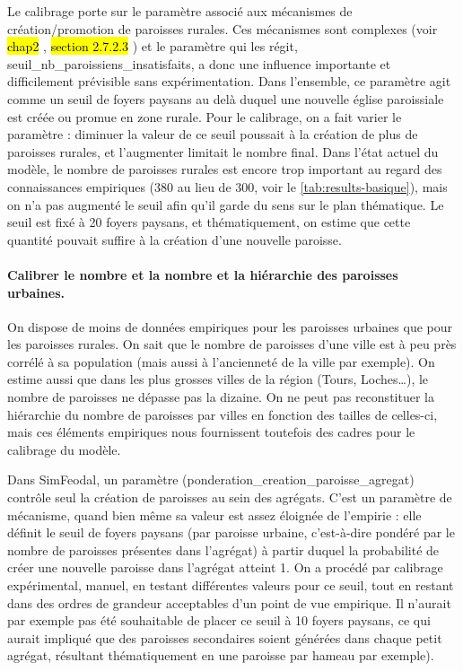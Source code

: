 Le calibrage porte sur le paramètre associé aux mécanismes de création/promotion de paroisses rurales.
Ces mécanismes sont complexes (voir \hl{chap2}%
, \hl{section 2.7.2.3}%
) et le paramètre qui les régit, \textsf{seuil\_nb\_paroissiens\_insatisfaits}, a donc une influence importante et difficilement prévisible sans expérimentation.
Dans l'ensemble, ce paramètre agit comme un seuil de foyers paysans au delà duquel une nouvelle église paroissiale est créée ou promue en zone rurale.
Pour le calibrage, on a fait varier le paramètre  : diminuer la valeur de ce seuil poussait à la création de plus de paroisses rurales, et l'augmenter limitait le nombre final.
Dans l'état actuel du modèle, le nombre de paroisses rurales est encore trop important au regard des connaissances empiriques (380 au lieu de 300, voir le \vref{tab:results-basique}), mais on n'a pas augmenté le seuil afin qu'il garde du sens sur le plan thématique.
Le seuil est fixé à 20 foyers paysans, et thématiquement, on estime que cette quantité pouvait suffire à la création d'une nouvelle paroisse.

\paragraph{Calibrer le nombre et la nombre et la hiérarchie des paroisses \og urbaines\fg{}.}

On dispose de moins de données empiriques pour les paroisses urbaines que pour les paroisses rurales.
On sait que le nombre de paroisses d'une ville est à peu près corrélé à sa population (mais aussi à l'ancienneté de la ville par exemple).
On estime aussi que dans les plus grosses villes de la région (Tours, Loches\ldots), le nombre de paroisses ne dépasse pas la dizaine.
On ne peut pas reconstituer la hiérarchie du nombre de paroisses par villes en fonction des tailles de celles-ci, mais ces éléments empiriques nous fournissent toutefois des cadres pour le calibrage du modèle.

Dans SimFeodal, un paramètre (\textsf{ponderation\_creation\_paroisse\_agregat}) contrôle seul la création de paroisses au sein des agrégats.
C'est un \og paramètre de mécanisme\fg{}, quand bien même sa valeur est assez éloignée de l'empirie : elle définit le seuil de foyers paysans (par paroisse urbaine, c'est-à-dire pondéré par le nombre de paroisses présentes dans l'agrégat) à partir duquel la probabilité de créer une nouvelle paroisse dans l'agrégat atteint 1.
On a procédé par calibrage expérimental, manuel, en testant différentes valeurs pour ce seuil, tout en restant dans des ordres de grandeur acceptables d'un point de vue empirique.
Il n'aurait par exemple pas été souhaitable de placer ce seuil à 10 foyers paysans, ce qui aurait impliqué que des paroisses secondaires soient générées dans chaque petit agrégat, résultant thématiquement en une paroisse par hameau par exemple).

